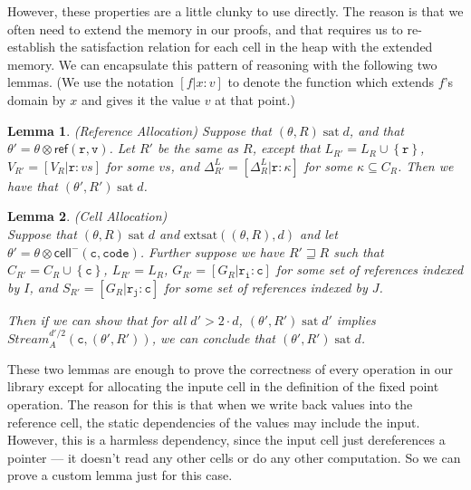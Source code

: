 \documentclass[nocopyrightspace,preprint]{sigplanconf}
\newcommand{\setof}[1]{\left\{{#1}\right\}}
\newcommand{\term}[1]{\ensuremath{\mathtt{{#1}}}}
\newcommand{\Stream}{\mathit{Stream}}
\newcommand{\cellminus}[2]{\mathsf{cell}^{-}({#1}, {#2})}
\newcommand{\satisfy}[2]{{#1}\;\mathrm{sat}\;{#2}}
\newcommand{\satisfyext}[2]{\mathrm{extsat}({#1}, {#2})}
\newtheorem{lemma}{Lemma}
\begin{document}
However, these properties are a little clunky to use directly. The
reason is that we often need to extend the memory in our proofs, and
that requires us to re-establish the satisfaction relation for each
cell in the heap with the extended memory. We can encapsulate this
pattern of reasoning with the following two lemmas. (We use the
notation $[f|x:v]$ to denote the function which extends $f$'s domain
by $x$ and gives it the value $v$ at that point.)

\begin{lemma}{(Reference Allocation)}
Suppose that $\satisfy{(\theta, R)}{d}$, and that $\theta' =
\theta \otimes \mathsf{ref}(\term{r,v})$. Let $R'$ be the same
as $R$, except that $L_{R'} = L_R \cup \setof{\term{r}}$, $V_{R'} = [V_R|\term{r}:vs]$ for some $vs$,
and $\Delta^L_{R'} = [\Delta^L_R|\term{r}:\kappa]$ for some $\kappa \subseteq C_R$.
Then we have that $\satisfy{(\theta', R')}{d}$. 
\end{lemma}

\begin{lemma}{(Cell Allocation)} \\
Suppose that $\satisfy{(\theta, R)}{d}$ and
$\satisfyext{(\theta,R)}{d}$ and let $\theta' = \theta \otimes
\cellminus{\term{c}}{\term{code}}$. Further suppose we have $R'
\sqsupseteq R$ such that $C_{R'} = C_R \cup \setof{\term{c}}$, $L_{R'}
= L_R$, $G_{R'} = [G_R | \term{r_i : c}]$ for some set of references
indexed by $I$, and $S_{R'} = [G_R | \term{r_j : c}]$ for some set of
references indexed by $J$.

Then if we can show that for all $d' > 2 \cdot d$,
$\satisfy{(\theta',R')}{d'}$ implies $\Stream^{d'/2}_A(\term{c},
(\theta', R'))$, we can conclude that $\satisfy{(\theta',R')}{d}$. 
\end{lemma}

These two lemmas are enough to prove the correctness of every
operation in our library except for allocating the inpute cell in the
definition of the fixed point operation. The reason for this is that
when we write back values into the reference cell, the static
dependencies of the values may include the input.  However, this is a
harmless dependency, since the input cell just dereferences a pointer
--- it doesn't read any other cells or do any other computation. So we
can prove a custom lemma just for this case.
\end{document}
